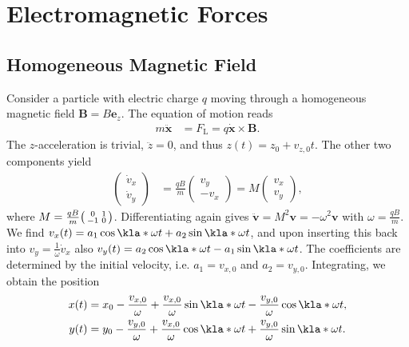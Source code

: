 \documentclass[english, parskip=full]{scrartcl}
\title{\Title}
\author{\Author}
\date{\today}
\begin{document}
\maketitle  %

\section{Electromagnetic Forces}
\subsection{Homogeneous Magnetic Field}
Consider a particle with electric charge $q$ moving through a homogeneous magnetic field $\textbf{B} = B\textbf{e}_z$.
The equation of motion reads
\begin{align}
m\ddot{\textbf{x}} &= F_\text{L} = q\dot{\textbf{x}} \times \textbf{B}.
\end{align}
The $z$-acceleration is trivial, $\ddot{z} = 0$, and thus $z(t) = z_0 + v_{z,0}t$.
The other two components yield
\begin{align}
\begin{pmatrix}
\dot{v}_x \\ \dot{v}_y
\end{pmatrix} &= \frac{qB}{m} \begin{pmatrix}
v_y \\ -v_x
\end{pmatrix} = M \begin{pmatrix}
v_x \\ v_y
\end{pmatrix},
\end{align}
where $M=\frac{qB}{m}\begin{psmallmatrix}
0 & 1 \\ -1 & 0
\end{psmallmatrix}$.
Differentiating again gives $\ddot{\textbf{v}} = M^2 \textbf{v} = - \omega^2 \textbf{v}$ with $\omega = \frac{qB}{m}$.
We find $v_x(t) = a_1 \cos\kla*{\omega t} + a_2 \sin\kla*{\omega t}$, and upon inserting this back into $v_y = \frac{1}{\omega}\dot{v}_x$ also $v_y(t) = a_2 \cos\kla*{\omega t} - a_1 \sin\kla*{\omega t}$.
The coefficients are determined by the initial velocity, i.e. $a_1 = v_{x,0}$ and $a_2 = v_{y,0}$.
Integrating, we obtain the position
\begin{align}
x(t) &= x_0 - \frac{v_{x,0}}{\omega} + \frac{v_{x,0}}{\omega} \sin\kla*{\omega t} - \frac{v_{y,0}}{\omega} \cos\kla*{\omega t},\\
y(t) &= y_0 - \frac{v_{y,0}}{\omega} + \frac{v_{x,0}}{\omega} \cos\kla*{\omega t} + \frac{v_{y,0}}{\omega} \sin\kla*{\omega t}.
\end{align}
\end{document}
